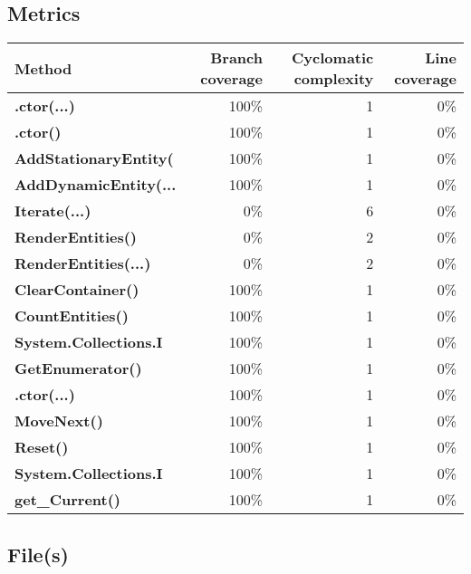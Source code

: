 \documentclass[a4paper,landscape,10pt]{article}
\begin{document}
\subsection{Metrics}
\begin{longtable}[l]{|l|r|r|r|}
\hline
\textbf{Method} & \textbf{Branch coverage} & \textbf{Cyclomatic complexity} & \textbf{Line coverage}\\
\hline
\textbf{.ctor(...)} & 100\% & 1 & 0\%\\
\hline
\textbf{.ctor()} & 100\% & 1 & 0\%\\
\hline
\textbf{AddStationaryEntity(} & 100\% & 1 & 0\%\\
\hline
\textbf{AddDynamicEntity(...} & 100\% & 1 & 0\%\\
\hline
\textbf{Iterate(...)} & 0\% & 6 & 0\%\\
\hline
\textbf{RenderEntities()} & 0\% & 2 & 0\%\\
\hline
\textbf{RenderEntities(...)} & 0\% & 2 & 0\%\\
\hline
\textbf{ClearContainer()} & 100\% & 1 & 0\%\\
\hline
\textbf{CountEntities()} & 100\% & 1 & 0\%\\
\hline
\textbf{System.Collections.I} & 100\% & 1 & 0\%\\
\hline
\textbf{GetEnumerator()} & 100\% & 1 & 0\%\\
\hline
\textbf{.ctor(...)} & 100\% & 1 & 0\%\\
\hline
\textbf{MoveNext()} & 100\% & 1 & 0\%\\
\hline
\textbf{Reset()} & 100\% & 1 & 0\%\\
\hline
\textbf{System.Collections.I} & 100\% & 1 & 0\%\\
\hline
\textbf{get\_Current()} & 100\% & 1 & 0\%\\
\hline
\end{longtable}
\subsection{File(s)}
\end{document}
